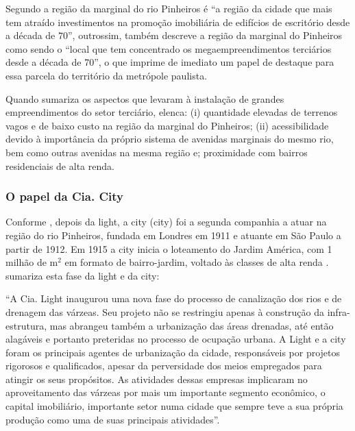 \documentclass[
article,			%
11pt,				%
oneside,			%
a4paper,			%
english,			%
brazil,				%
sumario=tradicional
]{abntex2}
\begin{document}
	Segundo  a região da marginal do rio Pinheiros é ``a região da cidade que mais tem atraído investimentos na promoção imobiliária de edifícios de escritório desde a década de 70'', outrossim,  também descreve a região da marginal do Pinheiros como sendo o ``local que tem concentrado os megaempreendimentos terciários desde a década de 70'', o que imprime de imediato um papel de destaque para essa parcela do território da metrópole paulista.

	Quando  sumariza os aspectos que levaram à instalação de grandes empreendimentos do setor terciário, elenca: (i) quantidade elevadas de terrenos vagos e de baixo custo na região da marginal do Pinheiros; (ii) acessibilidade devido à importância da próprio sistema de avenidas marginais do mesmo rio, bem como outras avenidas na mesma região e; proximidade com bairros residenciais de alta renda.

%	
	
	\subsubsection{O papel da Cia. City} \label{s3:ciacity}
	
	Conforme , depois da \gls{light}, a \gls{city} (\glsdesc{city}) foi a segunda companhia a atuar na região do rio Pinheiros, fundada em Londres em 1911 e atuante em São Paulo a partir de 1912. Em 1915 a \gls{city} inicia o loteamento do Jardim América, com 1 milhão de m$^{2}$ em formato de bairro-jardim, voltado às classes de alta renda .  sumariza esta fase da \gls{light} e da \gls{city}:
	
	\begin{citacao}
		``A Cia. Light inaugurou uma nova fase do processo de canalização dos rios e de drenagem das várzeas. Seu projeto não se restringiu apenas à construção da infra-estrutura, mas abrangeu também a urbanização das áreas drenadas, até então alagáveis e portanto preteridas no processo de ocupação urbana. A Light e a \gls{city} foram os principais agentes de urbanização da cidade, responsáveis por projetos rigorosos e qualificados, apesar da perversidade dos meios empregados para atingir os seus propósitos. As atividades dessas empresas implicaram no aproveitamento das várzeas por mais um importante segmento econômico, o capital imobiliário, importante setor numa cidade que sempre teve a sua própria produção como uma de suas principais atividades''.
	\end{citacao}
	
\end{document}

